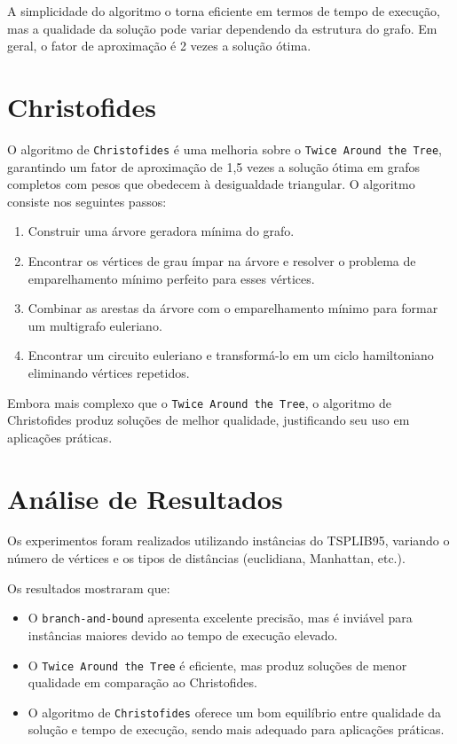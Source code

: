 \documentclass[12pt]{article}
\begin{document}
A simplicidade do algoritmo o torna eficiente em termos de tempo de execução, mas a qualidade da solução pode variar dependendo da estrutura do grafo. Em geral, o fator de aproximação é 2 vezes a solução ótima.

\section{Christofides}

O algoritmo de \texttt{Christofides} é uma melhoria sobre o \texttt{Twice Around the Tree}, garantindo um fator de aproximação de 1,5 vezes a solução ótima em grafos completos com pesos que obedecem à desigualdade triangular. O algoritmo consiste nos seguintes passos:

\begin{enumerate}
  \item Construir uma árvore geradora mínima do grafo.
  \item Encontrar os vértices de grau ímpar na árvore e resolver o problema de emparelhamento mínimo perfeito para esses vértices.
  \item Combinar as arestas da árvore com o emparelhamento mínimo para formar um multigrafo euleriano.
  \item Encontrar um circuito euleriano e transformá-lo em um ciclo hamiltoniano eliminando vértices repetidos.
\end{enumerate}

Embora mais complexo que o \texttt{Twice Around the Tree}, o algoritmo de Christofides produz soluções de melhor qualidade, justificando seu uso em aplicações práticas.

\section{Análise de Resultados}

Os experimentos foram realizados utilizando instâncias do TSPLIB95, variando o número de vértices e os tipos de distâncias (euclidiana, Manhattan, etc.).

Os resultados mostraram que:
\begin{itemize}
  \item O \texttt{branch-and-bound} apresenta excelente precisão, mas é inviável para instâncias maiores devido ao tempo de execução elevado.
  \item O \texttt{Twice Around the Tree} é eficiente, mas produz soluções de menor qualidade em comparação ao Christofides.
  \item O algoritmo de \texttt{Christofides} oferece um bom equilíbrio entre qualidade da solução e tempo de execução, sendo mais adequado para aplicações práticas.
\end{itemize}
\end{document}

